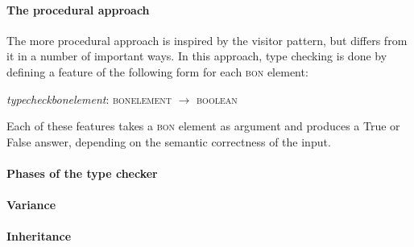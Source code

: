 \paragraph{}

\paragraph{The procedural approach} %
The more procedural approach is inspired by the visitor pattern, but differs from it in a number of important ways. In this approach, type checking is done by defining a feature of the following form for each \textsc{bon} element:
\begin{center}
\textit{type}\textunderscore\textit{check}\textunderscore\textit{bon}\textunderscore\textit{element}: \textsc{bon}\textunderscore\textsc{element} $\rightarrow$  \textsc{boolean}\\
\end{center}
Each of these features takes a \textsc{bon} element as argument and produces a True or False answer, depending on the semantic correctness of the input.


\paragraph{}

\paragraph{Phases of the type checker}

\paragraph{Variance}

\paragraph{Inheritance}
\cite[section~5.2]{appel2004}